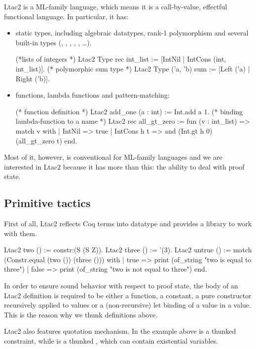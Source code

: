 Ltac2 is a ML-family language, which means it is a call-by-value, effectful functional language.
In particular, it has:
\begin{itemize}
\item static types, including algebraic datatypes, rank-1 polymorphism and several built-in types (, , , , , \ldots).
  \begin{coq}
  (*lists of integers *)
  Ltac2 Type rec int_list := [IntNil | IntCons (int, int_list)].
  (* polymorphic sum type *)
  Ltac2 Type ('a, 'b) sum := [Left ('a) | Right ('b)].
  \end{coq}
\item functions, lambda functions and pattern-matching:
  \begin{coq}
  (* function definition *)
  Ltac2 add_one (a : int) := Int.add a 1.
  (* binding lambda-function to a name *)
  Ltac2 rec all_gt_zero := fun (v : int_list) =>
    match v with
    | IntNil => true
    | IntCons h t => and (Int.gt h 0) (all_gt_zero t)
    end.
  \end{coq}
\end{itemize}

Most of it, however, is conventional for ML-family languages and  we are interested in Ltac2 because it has more than this: the ability to deal with proof state.

\subsection{Primitive tactics}
\label{sec:primitive-tactics}

First of all, Ltac2 reflects Coq terms into  datatype and provides a library to work with them.

\begin{coq}
Ltac2 two () := constr:(S (S Z)).
Ltac2 three () := '(3).
Ltac2 untrue () := match (Constr.equal (two ()) (three ())) with
  | true => print (of_string "two is equal to three")
  | false => print (of_string "two is not equal to three")
  end.
\end{coq}

In order to ensure sound behavior with respect to proof state, the body of an Ltac2 definition is required to be either a function, a constant, a pure constructor recursively applied to values or a (non-recursive) let binding of a value in a value.
This is the reason why we thunk definitions above.

Ltac2 also features quotation mechanism.
In the example above  is a thunked constraint, while  is a thunked , which can contain existential variables.

